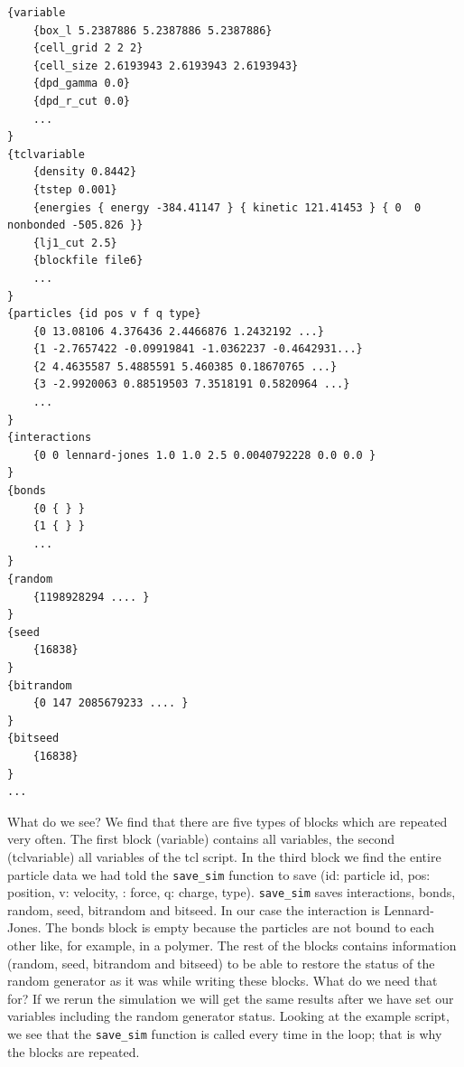 \documentclass[
paper=a4,                       %
fontsize=11pt,                  %
twoside,                        %
footsepline,                    %
headsepline,                    %
headinclude=false,              %
footinclude=false,              %
pagesize,                       %
]{scrartcl}
\newtheorem{task}{Task}
\begin{document}
{\small\vspace{0,2cm}
\begin{verbatim}
{variable 
	{box_l 5.2387886 5.2387886 5.2387886}
	{cell_grid 2 2 2}
	{cell_size 2.6193943 2.6193943 2.6193943}
	{dpd_gamma 0.0}
	{dpd_r_cut 0.0}
	...
}
{tclvariable 
	{density 0.8442}
	{tstep 0.001}
	{energies { energy -384.41147 } { kinetic 121.41453 } { 0  0 nonbonded -505.826 }}
	{lj1_cut 2.5}
	{blockfile file6}
	...
}
{particles {id pos v f q type} 
	{0 13.08106 4.376436 2.4466876 1.2432192 ...}
	{1 -2.7657422 -0.09919841 -1.0362237 -0.4642931...}
	{2 4.4635587 5.4885591 5.460385 0.18670765 ...}
	{3 -2.9920063 0.88519503 7.3518191 0.5820964 ...}
	...
}
{interactions 
	{0 0 lennard-jones 1.0 1.0 2.5 0.0040792228 0.0 0.0 }
}
{bonds  
	{0 { } }
	{1 { } }
	...
}
{random 
	{1198928294 .... }
}
{seed 
	{16838}
}
{bitrandom 
	{0 147 2085679233 .... }
}	
{bitseed 
	{16838}
}
...
\end{verbatim}
\vspace{0,2cm}
}
\noindent 
What do we see? We find that there are five types of blocks which are
repeated very often. The first block (variable) contains all \es{}
variables, the second (tclvariable) all variables of the tcl
script. In the third block we find the entire particle data we had
told the \lstinline|save_sim| function to save (id: particle id, pos:
position, v: velocity, : force, q: charge, type). \lstinline|save_sim|
saves interactions, bonds, random, seed, bitrandom and bitseed.  In
our case the interaction is Lennard-Jones. The bonds block is empty
because the particles are not bound to each other like, for example,
in a polymer. The rest of the blocks contains information (random,
seed, bitrandom and bitseed) to be able to restore the status of the
random generator as it was while writing these blocks.  What do we
need that for? If we rerun the simulation we will get the same results
after we have set our variables including the random generator
status. Looking at the example script, we see that the
\lstinline|save_sim| function is called every time in the loop; that
is why the blocks are repeated.

\vspace{1cm}\vspace{1cm}
\end{document}
